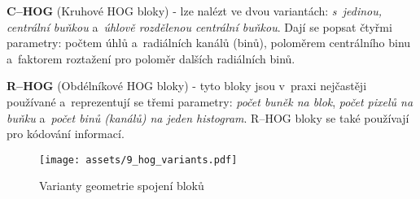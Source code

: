 \textbf{C--HOG} (Kruhové HOG bloky) - lze nalézt ve dvou variantách: \textit{s~jedinou, centrální buňkou} a~\textit{úhlově rozdělenou centrální buňkou}. Dají se popsat čtyřmi parametry: počtem úhlů a~radiálních kanálů (binů), poloměrem centrálního binu a~faktorem roztažení pro poloměr dalších radiálních binů.

\textbf{R--HOG} (Obdélníkové HOG bloky) - tyto bloky jsou v~praxi nejčastěji používané a~reprezentují se třemi parametry: \textit{počet buněk na blok}, \textit{počet pixelů na buňku} a~\textit{počet binů (kanálů) na jeden histogram}. R--HOG bloky se také používají pro kódování informací.
\begin{figure}[H]
    \centering
    \texttt{[image: assets/9\_hog\_variants.pdf]}
    \caption{Varianty geometrie spojení bloků}
    \label{variants_block}
\end{figure}

